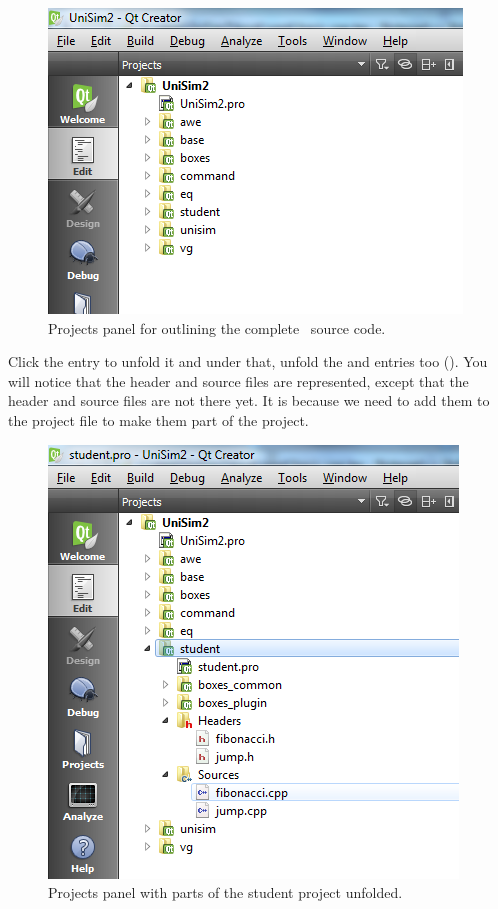 \begin{figure}
\centering
\includegraphics[scale=0.7]{graphics/qt-creator-projects}
\caption{Projects panel for  outlining the complete \US\ source code.}
\label{fig:qt-creator-projects}
\end{figure}

Click the  entry to unfold it and under that, unfold the  and  entries too (). You will notice that the header and source files are represented, except that the  header and source files are not there yet. It is because we need to add them to the  project file to make them part of the project.

\begin{figure}
\centering
\includegraphics[scale=0.7]{graphics/qt-creator-projects-student-1}
\caption{Projects panel with parts of the student project unfolded.}
\label{fig:qt-creator-projects-student-1}
\end{figure}

